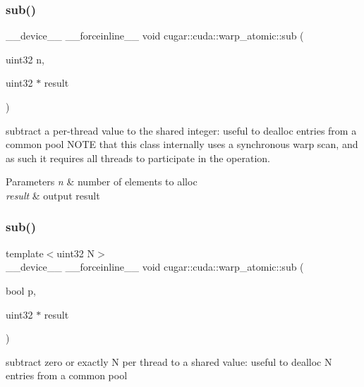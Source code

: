 \subsubsection{\texorpdfstring{sub()}{sub()}\hspace{0.1cm}{\footnotesize\ttfamily [3/6]}}
{\footnotesize\ttfamily \+\_\+\+\_\+device\+\_\+\+\_\+ \+\_\+\+\_\+forceinline\+\_\+\+\_\+ void cugar\+::cuda\+::warp\+\_\+atomic\+::sub (\begin{DoxyParamCaption}\item[{uint32}]{n,  }\item[{uint32 $\ast$}]{result }\end{DoxyParamCaption})\hspace{0.3cm}{\ttfamily [inline]}}

subtract a per-\/thread value to the shared integer\+: useful to dealloc entries from a common pool N\+O\+TE that this class internally uses a synchronous warp scan, and as such it requires all threads to participate in the operation.


\begin{DoxyParams}{Parameters}
{\em n} & number of elements to alloc \\
\hline
{\em result} & output result \\
\hline
\end{DoxyParams}
\mbox{\label{structcugar_1_1cuda_1_1warp__atomic_a84b549dd579a499a661c38bb482d7ff8}} 
\subsubsection{\texorpdfstring{sub()}{sub()}\hspace{0.1cm}{\footnotesize\ttfamily [4/6]}}
{\footnotesize\ttfamily template$<$uint32 N$>$ \\
\+\_\+\+\_\+device\+\_\+\+\_\+ \+\_\+\+\_\+forceinline\+\_\+\+\_\+ void cugar\+::cuda\+::warp\+\_\+atomic\+::sub (\begin{DoxyParamCaption}\item[{bool}]{p,  }\item[{uint32 $\ast$}]{result }\end{DoxyParamCaption})\hspace{0.3cm}{\ttfamily [inline]}}

subtract zero or exactly N per thread to a shared value\+: useful to dealloc N entries from a common pool


